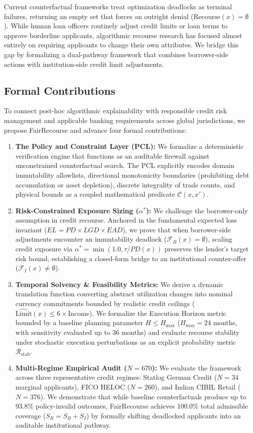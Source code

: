 \documentclass[manuscript,screen,review,anonymous]{acmart}
\begin{document}
Current counterfactual frameworks treat optimization deadlocks as terminal failures, returning an empty set that forces an outright denial ($\text{Recourse}(x) = \emptyset$). While human loan officers routinely adjust credit limits or loan terms to approve borderline applicants, algorithmic recourse research has focused almost entirely on requiring applicants to change their own attributes. We bridge this gap by formalizing a dual-pathway framework that combines borrower-side actions with institution-side credit limit adjustments.

\subsection{Formal Contributions}
To connect post-hoc algorithmic explainability with responsible credit risk management and applicable banking requirements across global jurisdictions, we propose FairRecourse and advance four formal contributions:
\begin{enumerate}
    \item \textbf{The Policy and Constraint Layer (PCL):} We formalize a deterministic verification engine that functions as an auditable firewall against unconstrained counterfactual search. The PCL explicitly encodes domain immutability allowlists, directional monotonicity boundaries (prohibiting debt accumulation or asset depletion), discrete integrality of trade counts, and physical bounds as a coupled mathematical predicate $\mathcal{C}(x, x')$.
    \item \textbf{Risk-Constrained Exposure Sizing ($\alpha^*$):} We challenge the borrower-only assumption in credit recourse. Anchored in the fundamental expected loss invariant ($EL = PD \times LGD \times EAD$), we prove that when borrower-side adjustments encounter an immutability deadlock ($\mathcal{F}_B(x) = \emptyset$), scaling credit exposure via $\alpha^* = \min(1.0, \tau / PD(x))$ preserves the lender's target risk bound, establishing a closed-form bridge to an institutional counter-offer ($\mathcal{F}_I(x) \neq \emptyset$).
    \item \textbf{Temporal Solvency \& Feasibility Metrics:} We derive a dynamic translation function converting abstract utilization changes into nominal currency commitments bounded by realistic credit ceilings ($\widehat{\text{Limit}}(x) \le 6 \times \text{Income}$). We formalize the Execution Horizon metric bounded by a baseline planning parameter $H \le H_{\max}$ ($H_{\max} = 24$ months, with sensitivity evaluated up to 36 months) and evaluate recourse stability under stochastic execution perturbations as an explicit probability metric $\mathcal{R}_{\text{stab}}$.
    \item \textbf{Multi-Regime Empirical Audit ($N=670$):} We evaluate the framework across three representative credit regimes: Statlog German Credit ($N=34$ marginal applicants), FICO HELOC ($N=260$), and Indian CIBIL Retail ($N=376$). We demonstrate that while baseline counterfactuals produce up to 93.8\% policy-invalid outcomes, FairRecourse achieves 100.0\% total admissible coverage ($S_R = S_B + S_I$) by formally shifting deadlocked applicants into an auditable institutional pathway.
\end{enumerate}
\end{document}
